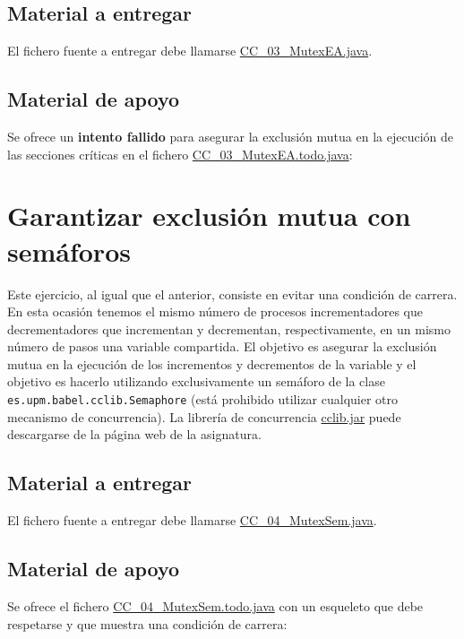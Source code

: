 \documentclass{article}
\begin{document}
\subsection*{Material a entregar}
El fichero fuente a entregar debe llamarse \url{CC_03_MutexEA.java}.

\subsection*{Material de apoyo}
Se ofrece un \textbf{intento
fallido} para asegurar la exclusión mutua en la ejecución de las
secciones críticas en el fichero \url{CC_03_MutexEA.todo.java}:


\clearpage
\section{Garantizar exclusión mutua con semáforos}
Este ejercicio, al igual que el anterior, consiste en evitar una
condición de carrera. En esta ocasión tenemos el mismo número de
procesos incrementadores que decrementadores que incrementan y
decrementan, respectivamente, en un mismo número de pasos una variable
compartida. El objetivo es asegurar la exclusión mutua en la ejecución
de los incrementos y decrementos de la variable y el objetivo es
hacerlo utilizando exclusivamente un semáforo de la clase
\lstinline{es.upm.babel.cclib.Semaphore} (está prohibido utilizar cualquier otro
mecanismo de concurrencia). La librería de concurrencia \url{cclib.jar}
puede descargarse de la página web de la asignatura.

\subsection*{Material a entregar}
El fichero fuente a entregar debe llamarse \url{CC_04_MutexSem.java}.

\subsection*{Material de apoyo}
Se ofrece el fichero \url{CC_04_MutexSem.todo.java} con un esqueleto
que debe respetarse y que muestra una condición de carrera:


\clearpage
\end{document}
